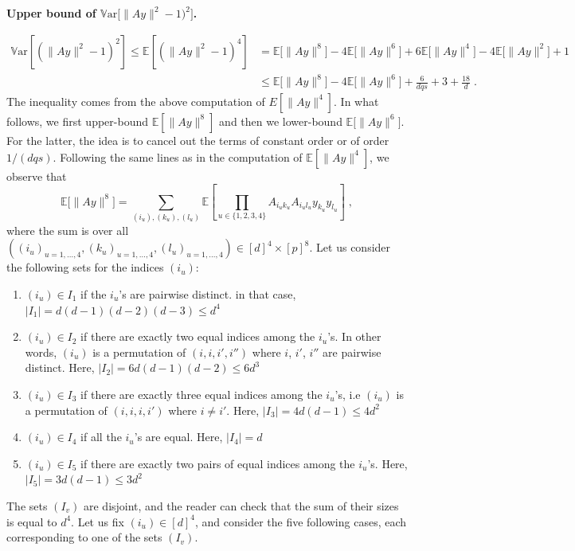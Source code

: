 \documentclass{ps}
\newcommand{\E}{\mathbb{E}}
\newcommand{\Var}{\mathbb{V}\!\mathrm{ar}}
\newcommand{\1}{\mathbbm{1}}
\theoremstyle{plain}
\begin{document}
\medskip
\noindent
{\bf Upper bound of $\Var\big[\|Ay\|^2 - 1)^2\big]$.}

\begin{align*}
	\Var\left[ (\|Ay\|^2 - 1)^2\right] \leq \E\left[ (\|Ay\|^2 - 1)^4 \right] &= \E\big[\|Ay\|^8\big] - 4\E\big[\|Ay\|^6\big] + 6\E\big[\|Ay\|^4\big] - 4\E\big[\|Ay\|^2\big] + 1\\
	&\leq \E\big[\|Ay\|^8\big] - 4\E\big[\|Ay\|^6\big] + \frac{6}{dqs} + 3 + \frac{18}{d}\; .
\end{align*}
The inequality comes from the above computation of $E[\|Ay\|^4]$. In what follows, we first upper-bound $\E[\|Ay\|^8]$ and then we lower-bound $\E\big[\|Ay\|^6\big]$. For the latter, the idea is to cancel out the terms of constant order or of order $1/(dqs)$. Following the same lines as in the computation of $\E[\|Ay\|^4]$, we observe that 
\begin{equation}\label{eq:computation_moment_8}
	\E\big[\|Ay\|^8\big] = \sum_{(i_u), (k_u), (l_u)} \E\left[\prod_{u \in \{1, 2, 3, 4\}} A_{{i_u}{k_u}}A_{{i_u}{l_u}}y_{k_u}y_{l_u}\right] \;,
\end{equation}
where the sum is over all $((i_u)_{u=1, \dots, 4}, (k_u)_{u=1, \dots, 4},(l_u)_{u=1, \dots, 4}) \in [d]^4 \times [p]^8$. Let us consider the following sets for the indices $(i_u)$:
\begin{enumerate}
	\item $(i_u) \in I_1$ if the $i_u$'s are pairwise distinct. in that case, $|I_1| = d(d-1)(d-2)(d-3) \leq d^4$
	\item $(i_u) \in I_2$ if there are exactly two equal indices among the $i_u$'s. In other words, $(i_u)$ is a permutation of $(i,i,i',i'')$ where $i$, $i'$, $i''$ are pairwise distinct. Here, $|I_2| = 6d(d-1)(d-2) \leq 6d^3$
	\item $(i_u) \in I_3$ if there are exactly three equal indices among the $i_u$'s, i.e $(i_u)$ is a permutation of $(i,i,i,i')$ where $i \neq i'$. Here, $|I_3| = 4d(d-1) \leq 4d^2$
	\item $(i_u) \in I_4$ if all the $i_u$'s are equal. Here, $|I_4| = d$
	\item $(i_u) \in I_5$ if there are exactly two pairs of equal indices among the $i_u$'s. Here, $|I_5| = 3d(d-1) \leq 3d^2$
\end{enumerate}
The sets $(I_v)$ are disjoint, and the reader can check that the sum of their sizes is equal to $d^4$. Let us fix $(i_u) \in [d]^4$, and consider the five following cases, each corresponding to one of the sets $(I_v)$.
\end{document}
